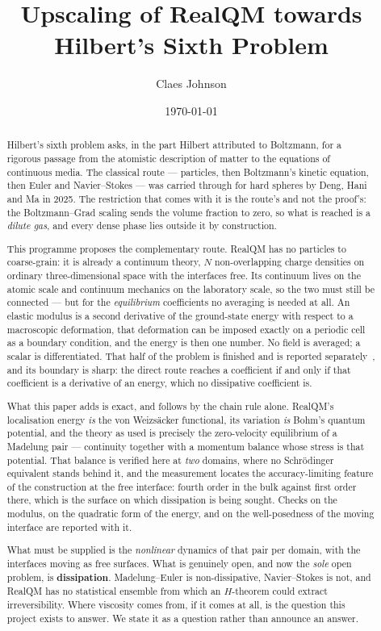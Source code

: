 \documentclass[11pt]{article}
\title{Upscaling of RealQM towards Hilbert's Sixth Problem}
\author[1]{Claes Johnson}
\affil[1]{KTH Royal Institute of Technology, SE-100 44 Stockholm, Sweden \\
\small\texttt{claesjohnson@gmail.com}}
\date{\today}
\begin{document}
\maketitle

\begin{abstract}
Hilbert's sixth problem asks, in the part Hilbert attributed to Boltzmann, for a rigorous passage
from the atomistic description of matter to the equations of continuous media. The classical route
--- particles, then Boltzmann's kinetic equation, then Euler and Navier--Stokes --- was carried
through for hard spheres by Deng, Hani and Ma in 2025. The restriction that comes with it is the
route's and not the proof's: the Boltzmann--Grad scaling sends the volume fraction to zero, so what
is reached is a \emph{dilute gas}, and every dense phase lies outside it by construction.

This programme proposes the complementary route. RealQM has no particles to coarse-grain: it is
already a continuum theory, $N$ non-overlapping charge densities on ordinary three-dimensional space
with the interfaces free. Its continuum lives on the atomic scale and continuum mechanics on the
laboratory scale, so the two must still be connected --- but for the \emph{equilibrium} coefficients
no averaging is needed at all. An elastic modulus is a second derivative of the ground-state energy
with respect to a macroscopic deformation, that deformation can be imposed exactly on a periodic
cell as a boundary condition, and the energy is then one number. No field is averaged; a scalar is
differentiated. That half of the problem is finished and is reported separately~\cite{elasticity},
and its boundary is sharp: the direct route reaches a coefficient if and only if that coefficient is
a derivative of an energy, which no dissipative coefficient is.

What this paper adds is exact, and follows by the chain rule alone. RealQM's localisation energy
\emph{is} the von Weizs\"acker functional, its variation \emph{is} Bohm's quantum potential, and the
theory as used is precisely the zero-velocity equilibrium of a Madelung pair --- continuity together
with a momentum balance whose stress is that potential. That balance is verified here at \emph{two}
domains, where no Schr\"odinger equivalent stands behind it, and the measurement locates the
accuracy-limiting feature of the construction at the free interface: fourth order in the bulk
against first order there, which is the surface on which dissipation is being sought. Checks on the
modulus, on the quadratic form of the energy, and on the well-posedness of the moving interface are
reported with it.

What must be supplied is the \emph{nonlinear} dynamics of that pair per domain, with the interfaces
moving as free surfaces. What is genuinely open, and now the \emph{sole} open problem, is
\textbf{dissipation}. Madelung--Euler is non-dissipative, Navier--Stokes is not, and RealQM has no
statistical ensemble from which an $H$-theorem could extract irreversibility. Where viscosity comes
from, if it comes at all, is the question this project exists to answer. We state it as a question
rather than announce an answer.
\end{abstract}
\end{document}
